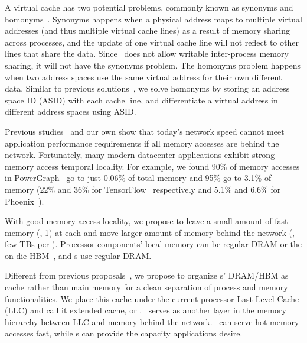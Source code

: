 \documentclass[10pt,times,twocolumn]{z2-article}
\begin{document}
{{{{{{{A virtual cache has two potential problems, commonly known as synonyms and homonyms~\cite{CacheMemory82}.
Synonyms happens when a physical address maps to multiple virtual addresses (and thus multiple virtual cache lines) 
as a result of memory sharing across processes,
and the update of one virtual cache line will not reflect to other lines that share the data.
Since \lego\ does not allow writable inter-process memory sharing,
it will not have the synonyms problem.
The homonyms problem happens when two address spaces use the same virtual address for their own different data.
Similar to previous solutions~\cite{OVC}, we solve homonyms by storing an address space ID (ASID) with each cache line,
and differentiate a virtual address in different address spaces using ASID.

Previous studies~\cite{Gao16-OSDI,GU17-NSDI} and our own show that today's network speed 
cannot meet application performance requirements if all memory accesses are behind the network. 
Fortunately, many modern datacenter applications exhibit strong memory access temporal locality.
For example, we found 90\% of memory accesses in PowerGraph~\cite{Gonzalez12-OSDI} go to just 0.06\% of total memory
and 95\% go to 3.1\% of memory
(22\% and 36\% for TensorFlow~\cite{TensorFlow} respectively
and 5.1\% and 6.6\% for Phoenix~\cite{Ranger07-HPCA}).

With good memory-access locality, we propose to %
leave a small amount of fast memory (\eg, 1\GB) at each \pcomponent{}
and move larger amount of memory behind the network (\eg, few TBs per \mcomponent{}).
Processor components' local memory can be regular DRAM 
or the on-die HBM~\cite{HBM-JEDEC,Knights-Landing},
and \mcomponent{}s use regular DRAM.

Different from previous proposals~\cite{Lim09-disaggregate}, 
we propose to organize \pcomponent{}s' DRAM/HBM as cache rather than main memory
for a clean separation of process and memory functionalities.
We place this cache under the current processor Last-Level Cache (LLC)
and call it extended cache, or {\em \excache}.
\excache\ serves as another layer in the memory hierarchy between LLC and memory behind the network.
\excache\ can serve hot memory accesses fast, while \mcomponent{}s can provide the capacity applications desire. 

}}}}}}}
\end{document}
